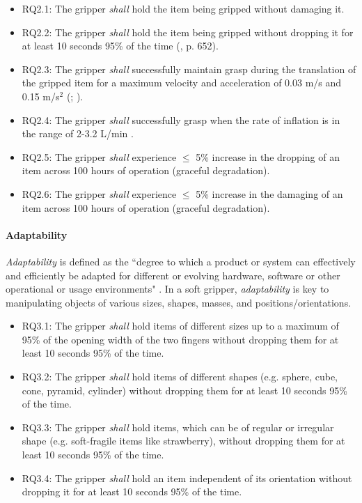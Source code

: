 \documentclass[letterpaper, 10 pt, conference]{ieeeconf}  %
\begin{document}
	\begin{itemize}[leftmargin=*]
		\item RQ2.1: The gripper \emph{shall} hold the item being gripped without damaging it. 
		\item RQ2.2: The gripper \emph{shall} hold the item being gripped without dropping it for at least 10 seconds 95\% of the time (\cite{Sotiropoulos2018}, p. 652).
		\item RQ2.3: The gripper \emph{shall} successfully maintain grasp during the translation of the gripped item for a maximum velocity and acceleration of 0.03 m/s and 0.15 m/s$^2$ (\cite{Triantafyllou2019}; \cite{Cheng2021}).
		\item RQ2.4: The gripper \emph{shall} successfully grasp when the rate of inflation is in the range of 2-3.2 L/min \cite{DEWIN2022}.
		\item RQ2.5: The gripper \emph{shall} experience $\le$ 5\% increase in the dropping of an item across 100 hours of operation (graceful degradation). %
		\item RQ2.6: The gripper \emph{shall} experience $\le$ 5\% increase in the damaging of an item across 100 hours of operation (graceful degradation).  %
	\end{itemize}
	\paragraph{\textbf{Adaptability}} \label{adaptability}
	\emph{Adaptability} is defined as the ``degree to which a product or system can effectively and efficiently be adapted for different or evolving hardware, software or other operational or usage environments" \cite{ISO24765:2017}. In a soft gripper, \emph{adaptability} is key to manipulating objects of various sizes, shapes, masses, and positions/orientations. 
	\begin{itemize}[leftmargin=*]
		\item RQ3.1: The gripper \emph{shall} hold items of different sizes up to a maximum of 95\% of the opening width of the two fingers without dropping them for at least 10 seconds 95\% of the time.
		\item RQ3.2: The gripper \emph{shall} hold items of different shapes (e.g. sphere, cube, cone, pyramid, cylinder) without dropping them for at least 10 seconds 95\% of the time.
		\item RQ3.3: The gripper \emph{shall} hold items, which can be of regular or irregular shape (e.g. soft-fragile items like strawberry), without dropping them for at least 10 seconds 95\% of the time.
		\item RQ3.4: The gripper \emph{shall} hold an item independent of its orientation without dropping it for at least 10 seconds 95\% of the time. 	  
	\end{itemize}
	
\end{document}
